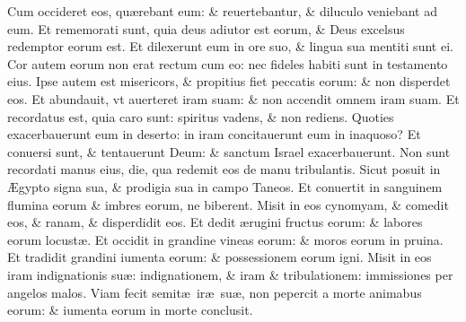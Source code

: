\documentclass[a5paper,10pt]{book}
\def\ae{æ}
\def\AE{Æ}
\begin{document}
\begin{multicols*}{2}
\newline \color{red} C\color{black}um occideret eos, qu\ae rebant eum: \& reuertebantur, \& diluculo veniebant ad eum.
\newline \color{red} E\color{black}t rememorati sunt, quia deus adiutor est eorum, \& Deus excelsus redemptor eorum est.
\newline \color{red} E\color{black}t dilexerunt eum in ore suo, \& lingua sua mentiti sunt ei.
\newline \color{red} C\color{black}or autem eorum non erat rectum cum eo: nec fideles habiti sunt in testamento eius.
\newline \color{red} I\color{black}pse autem est misericors, \& propitius fiet peccatis eorum: \& non disperdet eos.
\newline \color{red} E\color{black}t abundauit, vt auerteret iram suam: \& non accendit omnem iram suam.
\newline \color{red} E\color{black}t recordatus est, quia caro sunt: spiritus vadens, \& non rediens.
\newline \color{red} Q\color{black}uoties exacerbauerunt eum in deserto: in iram concitauerunt eum in inaquoso?
\newline \color{red} E\color{black}t conuersi sunt, \& tentauerunt Deum: \& sanctum Israel exacerbauerunt.
\newline \color{red} N\color{black}on sunt recordati manus eius, die, qua redemit eos de manu tribulantis.
\newline \color{red} S\color{black}icut posuit in \AE gypto signa sua, \& prodigia sua in campo Taneos.
\newline \color{red} E\color{black}t conuertit in sanguinem flumina eorum \& imbres eorum, ne biberent.
\newline \color{red} M\color{black}isit in eos cynomyam, \& comedit eos, \& ranam, \& disperdidit eos.
\newline \color{red} E\color{black}t dedit \ae rugini fructus eorum: \& labores eorum locust\ae .
\newline \color{red} E\color{black}t occidit in grandine vineas eorum: \& moros eorum in pruina.
\newline \color{red} E\color{black}t tradidit grandini iumenta eorum: \& possessionem eorum igni.
\newline \color{red} M\color{black}isit in eos iram indignationis su\ae : indignationem, \& iram \& tribulationem: immissiones per angelos malos.
\newline \color{red} V\color{black}iam fecit semit\ae \ ir\ae \ su\ae , non pepercit a morte animabus eorum: \& iumenta eorum in morte conclusit.

\end{multicols*}
\end{document}
